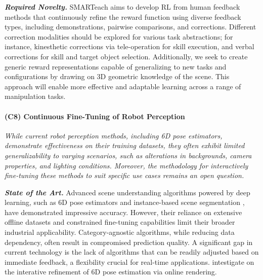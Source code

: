 \documentclass{erc-B2}
\begin{document}
\textit{\textbf{Required Novelty.}} SMARTeach aims to develop RL from human feedback methods that continuously refine the reward function using diverse feedback types, including demonstrations, pairwise comparisons, and corrections. Different correction modalities should be explored for various task abstractions; for instance, kinesthetic corrections via tele-operation for skill execution, and verbal corrections for skill and target object selection. Additionally, we seek to create generic reward representations capable of generalizing to new tasks and configurations by drawing on 3D geometric knowledge of the scene. This approach will enable more effective and adaptable learning across a range of manipulation tasks.

\paragraph{(C8) Continuous Fine-Tuning of Robot Perception}
\textit{While current robot perception methods, including 6D pose estimators, demonstrate effectiveness on their training datasets, they often exhibit limited generalizability to varying scenarios, such as alterations in backgrounds, camera properties, and lighting conditions. Moreover, the methodology for interactively fine-tuning these methods to suit specific use cases remains an open question.}


\textit{\textbf{State of the Art.}}
Advanced scene understanding algorithms powered by deep learning, such as 6D pose estimators \cite{duffhauss22MV6D,FFB6D,DenseFusion,pvn3d} and instance-based scene segmentation \cite{SAM,DINOv2,UOC,He_2017_ICCV}, have demonstrated impressive accuracy. However, their reliance on extensive offline datasets and constrained fine-tuning capabilities limit their broader industrial applicability. Category-agnostic algorithms, while reducing data dependency, often result in compromised prediction quality. A significant gap in current technology is the lack of algorithms that can be readily adjusted based on immediate feedback, a flexibility crucial for real-time applications. \cite{Inerf,RePOSE,chen2020category} intestigate on the interative refinement of 6D pose estimation via online rendering. 
\end{document}
